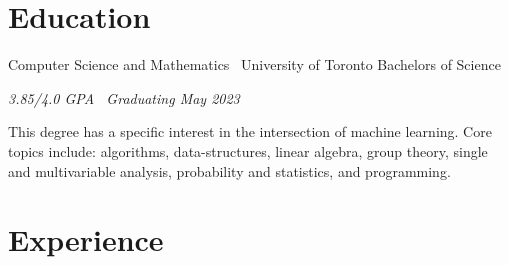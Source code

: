 \documentclass[]{style}
\begin{document}
\section{Education}

\begin{entrylist}


\entry
{Computer Science and Mathematics \ {\normalfont University of Toronto}}
{Bachelors of Science}
{\emph{3.85/4.0 GPA \ Graduating May 2023}
~ \vspace{1mm}

This degree has a specific interest in the intersection of machine learning. Core topics include: algorithms, data-structures, linear algebra, group theory, single and multivariable analysis, probability and statistics, and programming.}


\end{entrylist}


\section{Experience}
\end{document}

